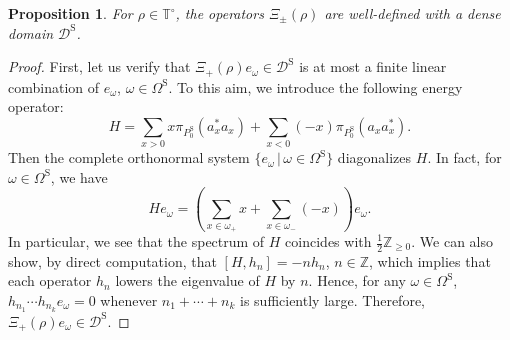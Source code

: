 \documentclass[pdftex]{sigma}
\numberwithin{equation}{section}
\newtheorem{Proposition}[Theorem]{Proposition}
 { \theoremstyle{definition}
\newtheorem{Definition}[Theorem]{Definition}
\newtheorem{Example}[Theorem]{Example}
\newtheorem{Remark}[Theorem]{Remark} }
\newcommand{\mcal}[1]{\mathcal{#1}}
\newcommand{\mbb}[1]{\mathbb{#1}}
\newcommand{\mrm}[1]{\mathrm{#1}}
\begin{document}
\begin{Proposition}
For $\rho\in\mbb{T}^{\circ}$, the operators $\Xi_{\pm}(\rho)$ are well-defined with a dense domain $\mcal{D}^{\mrm{S}}$.
\end{Proposition}
\begin{proof}
First, let us verify that $\Xi_{+}(\rho)e_{\omega}\in\mcal{D}^{\mrm{S}}$ is at most a finite linear combination of $e_{\omega}$, $\omega\in\Omega^{\mrm{S}}$.
To this aim, we introduce the following energy operator:
\begin{equation*}
	H=\sum_{x>0}x\pi_{P_{0}^{\mrm{S}}}(a_{x}^{\ast}a_{x})+\sum_{x<0}(-x)\pi_{P_{0}^{\mrm{S}}}(a_{x}a_{x}^{\ast}).
\end{equation*}
Then the complete orthonormal system $\big\{e_{\omega}\,|\,\omega\in\Omega^{\mrm{S}}\big\}$ diagonalizes $H$. In fact, for $\omega\in \Omega^{\mrm{S}}$, we have
\begin{equation*}
	He_{\omega}=\left(\sum_{x\in \omega_{+}}x+\sum_{x\in\omega_{-}}(-x)\right)e_{\omega}.
\end{equation*}
In particular, we see that the spectrum of $H$ coincides with $\frac{1}{2}\mbb{Z}_{\ge 0}$.
We can also show, by direct computation, that $[H,h_{n}]=-nh_{n}$, $n\in\mbb{Z}$, which implies that each operator $h_{n}$ lowers the eigenvalue of $H$ by $n$. Hence, for any $\omega\in\Omega^{\mrm{S}}$, $h_{n_{1}}\cdots h_{n_{k}}e_{\omega}=0$ whenever $n_{1}+\cdots +n_{k}$ is sufficiently large. Therefore, $\Xi_{+}(\rho)e_{\omega}\in\mcal{D}^{\mrm{S}}$.


\end{proof}
\end{document}
